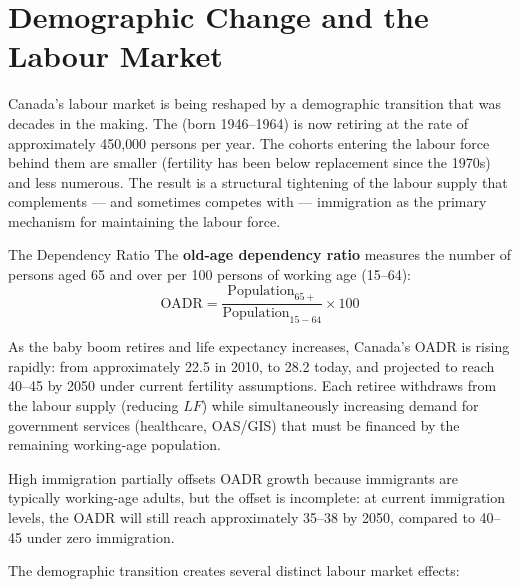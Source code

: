\section{Demographic Change and the Labour Market}
\label{sec:demographics}

Canada's labour market is being reshaped by a demographic transition
that was decades in the making. The  (born
1946--1964) is now retiring at the rate of approximately 450{,}000 persons
per year. The cohorts entering the labour force behind them are smaller
(fertility has been below replacement since the 1970s) and less numerous.
The result is a structural tightening of the labour supply that
complements --- and sometimes competes with --- immigration as the
primary mechanism for maintaining the labour force.

\begin{defbox}{The Dependency Ratio}
The \textbf{old-age dependency ratio} measures the number of persons aged
65 and over per 100 persons of working age (15--64):
\begin{equation}
  \text{OADR} = \frac{\text{Population}_{65+}}{\text{Population}_{15-64}} \times 100
  \label{eq:oadr}
\end{equation}

As the baby boom retires and life expectancy increases, Canada's OADR is
rising rapidly: from approximately 22.5 in 2010, to 28.2 today, and
projected to reach 40--45 by 2050 under current fertility assumptions.
Each retiree withdraws from the labour supply (reducing $LF$) while
simultaneously increasing demand for government services (healthcare,
OAS/GIS) that must be financed by the remaining working-age population.

High immigration partially offsets OADR growth because immigrants are
typically working-age adults, but the offset is incomplete: at current
immigration levels, the OADR will still reach approximately 35--38 by 2050,
compared to 40--45 under zero immigration.
\end{defbox}

The demographic transition creates several distinct labour market effects:

